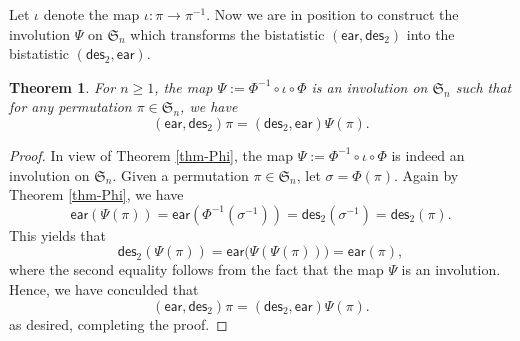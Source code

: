 \documentclass[12pt]{article}
\numberwithin{equation}{section}
\theoremstyle{plain}
\newtheorem{theorem}{Theorem}[section]
\def\des{\mathsf{des}}
\def\ear{\mathsf{ear}}
\begin{document}
  Let $\iota$ denote the map $\iota:\pi\rightarrow \pi^{-1}$. Now we are in position to construct the involution $\Psi$ on $\mathfrak{S}_n$ which transforms the bistatistic $(\ear, \des_2)$ into the bistatistic  $(\des_2, \ear)$. 
   \begin{theorem}\label{thm-Psi}
  	For $n\geq 1$, the map $\Psi:=\Phi^{-1}\circ \iota \circ \Phi$ is  an involution on    $\mathfrak{S}_n$   such that for any permutation $\pi\in \mathfrak{S}_n$, we have  
  	$$
  	(\ear, \des_2)\pi= (\des_2, \ear)\Psi(\pi).
  	$$
  \end{theorem}
    \begin{proof}
    In view of  Theorem \ref{thm-Phi}, the map $\Psi:=\Phi^{-1}\circ \iota \circ \Phi$ is indeed an involution on $\mathfrak{S}_n$. Given a permutation $\pi\in \mathfrak{S}_n$,  let   $\sigma=\Phi(\pi)$. 
    Again by Theorem \ref{thm-Phi}, we have
    \begin{equation}\label{eq-Psi}
     \ear(\Psi(\pi))=	\ear(\Phi^{-1}(\sigma^{-1}))=\des_2(\sigma^{-1})=\des_2(\pi).
    	\end{equation}
  This yields that
   \[
   \des_2(\Psi(\pi))=\ear\bigl(\Psi(\Psi(\pi))\bigr)=\ear(\pi),
   \]
  where the second equality follows from the fact that the map $\Psi$ is an involution.  Hence, we have conculded that $$
  	(\ear, \des_2)\pi= (\des_2, \ear)\Psi(\pi).
  $$
  as desired, completing the proof. 
    	 	\end{proof}
    	 	
    	 	
    	 
\end{document}
